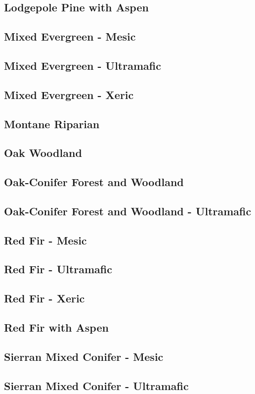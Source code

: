 \subsection{Lodgepole Pine with Aspen} 
\subsection{Mixed Evergreen - Mesic} 
\subsection{Mixed Evergreen - Ultramafic} 
\subsection{Mixed Evergreen - Xeric} 
\subsection{Montane Riparian} 
\subsection{Oak Woodland} 
\subsection{Oak-Conifer Forest and Woodland} 
\subsection{Oak-Conifer Forest and Woodland - Ultramafic} 
\subsection{Red Fir - Mesic} 
\subsection{Red Fir - Ultramafic} 
\subsection{Red Fir - Xeric} 
\subsection{Red Fir with Aspen} 
\subsection{Sierran Mixed Conifer - Mesic} 
\subsection{Sierran Mixed Conifer - Ultramafic} 
